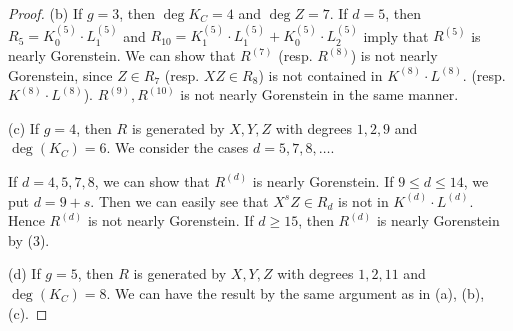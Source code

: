 \documentclass[10pt,a4paper]{amsart}
\begin{document}
\begin{proof}
\par 
(b) If $g=3$, then $\deg K_C =4$ and $\deg Z =7$. If $d=5$, then 
$R_5 = K^{(5)}_0 \cdot  L^{(5)}_1$ and 
$R_{10} = K^{(5)}_1 \cdot  L^{(5)}_1 + 
K^{(5)}_0 \cdot  L^{(5)}_2$ imply that $R^{(5)}$ is nearly Gorenstein. 
We can show that $R^{(7)}$ (resp. $R^{(8)}$) is not nearly Gorenstein, 
since $Z \in R_7$ (resp. $XZ \in R_8$) is not contained in 
$K^{(8)} \cdot  L^{(8)}$. 
(resp. $K^{(8)} \cdot  L^{(8)}$). $R^{(9)}, R^{(10)}$ is not nearly Gorenstein in the same manner. 
\par  
(c) If $g=4$, then  $R$ is generated by $X,Y,Z$ with degrees $1,2, 9$ and $\deg (K_C) = 6$.  
We consider the cases $d = 5,7,8, \ldots$.
\par
If $d = 4,5,7,8$, we can show that $R^{(d)}$ is nearly Gorenstein. 
If $9\le d \le 14$, we put  
$d = 9+s$. 
Then we can easily see that $X^s Z\in R_d$ is not in  $K^{(d)} \cdot  L^{(d)}$.
Hence  $R^{(d)}$ is not nearly Gorenstein. If $d \ge 15$, then $R^{(d)}$ is nearly Gorenstein
by (3). 
\par 
(d) If $g=5$, then  $R$ is generated by $X,Y,Z$ with degrees $1,2, 11$ and $\deg (K_C) = 8$.
We can have the result by the same argument as in (a), (b), (c). 
\end{proof} 
\end{document}
